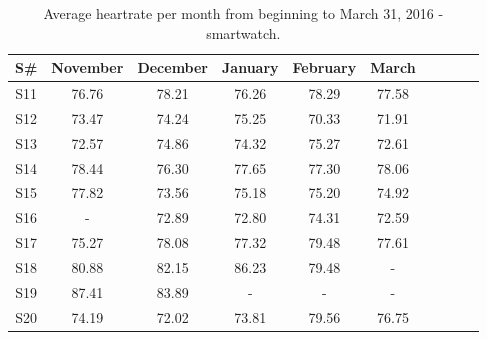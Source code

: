 \documentclass[12pt]{article} %
\begin{document}
\begin{table}[H]
\center
\begin{footnotesize}
	\begin{tabular}{| c | c | c | c | c | c | c | c | c | c |}
	\hline
	\textbf{S\#} & \textbf{November} & \textbf{December} & \textbf{January} & \textbf{February} & \textbf{March} \\
	
	\hline
	S11 & 76.76 & 78.21 & 76.26 & 78.29 & 77.58\\
	\hline
	S12 & 73.47 & 74.24 & 75.25 & 70.33 & 71.91\\
	\hline
	S13 & 72.57 & 74.86 & 74.32 & 75.27 & 72.61\\
	\hline
	S14 & 78.44 & 76.30 & 77.65 & 77.30 & 78.06\\
	\hline
	S15 & 77.82 & 73.56 & 75.18 & 75.20 & 74.92\\
	\hline
	S16 & - & 72.89 & 72.80 & 74.31 & 72.59\\
	\hline
	S17 & 75.27 & 78.08 & 77.32 & 79.48 & 77.61\\
	\hline
	S18 & 80.88 & 82.15 & 86.23 & 79.48 & - \\
	\hline
	S19 & 87.41 & 83.89 & - & - & -\\
	\hline
	S20 & 74.19 & 72.02 & 73.81 & 79.56 & 76.75\\
	\hline
	\end{tabular}
	\caption{Average heartrate per month from beginning to March 31, 2016 - smartwatch.}
	\label{tab:heartrateWatch}
\end{footnotesize}
\end{table}
\end{document}
